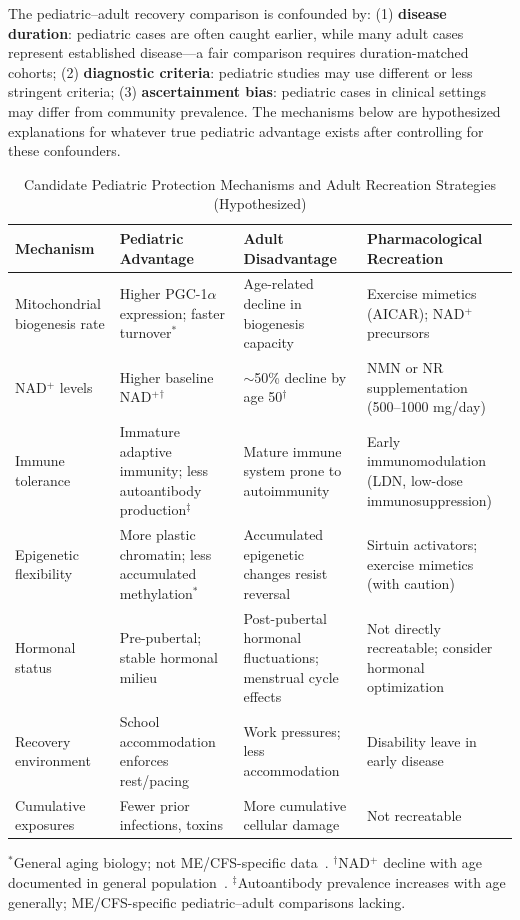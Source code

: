 \begin{warning}
The pediatric--adult recovery comparison is confounded by: (1) \textbf{disease duration}: pediatric cases are often caught earlier, while many adult cases represent established disease---a fair comparison requires duration-matched cohorts; (2) \textbf{diagnostic criteria}: pediatric studies may use different or less stringent criteria; (3) \textbf{ascertainment bias}: pediatric cases in clinical settings may differ from community prevalence. The mechanisms below are hypothesized explanations for whatever true pediatric advantage exists after controlling for these confounders.
\end{warning}

\begin{table}[htbp]
\centering
\caption{Candidate Pediatric Protection Mechanisms and Adult Recreation Strategies (Hypothesized)}
\label{tab:pediatric-protection}
\begin{tabular}{p{3cm}p{3.5cm}p{3.5cm}p{3cm}}
\toprule
\textbf{Mechanism} & \textbf{Pediatric Advantage} & \textbf{Adult Disadvantage} & \textbf{Pharmacological Recreation} \\
\midrule
Mitochondrial biogenesis rate & Higher PGC-1$\alpha$ expression; faster turnover$^*$ & Age-related decline in biogenesis capacity & Exercise mimetics (AICAR); NAD$^+$ precursors \\
\addlinespace
NAD$^+$ levels & Higher baseline NAD$^+$$^\dagger$ & $\sim$50\% decline by age 50$^\dagger$ & NMN or NR supplementation (500--1000 mg/day) \\
\addlinespace
Immune tolerance & Immature adaptive immunity; less autoantibody production$^\ddagger$ & Mature immune system prone to autoimmunity & Early immunomodulation (LDN, low-dose immunosuppression) \\
\addlinespace
Epigenetic flexibility & More plastic chromatin; less accumulated methylation$^*$ & Accumulated epigenetic changes resist reversal & Sirtuin activators; exercise mimetics (with caution) \\
\addlinespace
Hormonal status & Pre-pubertal; stable hormonal milieu & Post-pubertal hormonal fluctuations; menstrual cycle effects & Not directly recreatable; consider hormonal optimization \\
\addlinespace
Recovery environment & School accommodation enforces rest/pacing & Work pressures; less accommodation & Disability leave in early disease \\
\addlinespace
Cumulative exposures & Fewer prior infections, toxins & More cumulative cellular damage & Not recreatable \\
\bottomrule
\end{tabular}

\smallskip
\footnotesize{$^*$General aging biology; not ME/CFS-specific data~\cite{Lopez-Otin2013aging}. $^\dagger$NAD$^+$ decline with age documented in general population~\cite{Massudi2012nad}. $^\ddagger$Autoantibody prevalence increases with age generally; ME/CFS-specific pediatric--adult comparisons lacking.}
\end{table}

